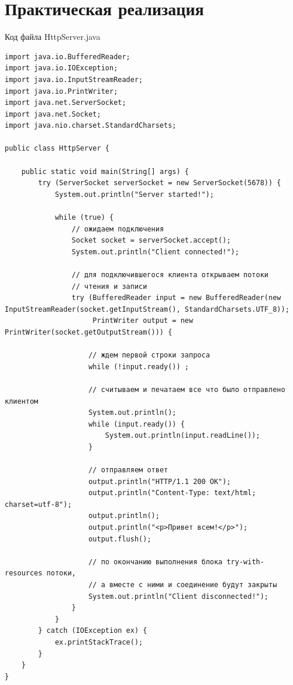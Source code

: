 \documentclass[a4paper, 14pt]{extarticle}
\begin{document}
\section{Практическая реализация}
Код файла HttpServer.java
\begin{lstlisting}
import java.io.BufferedReader;
import java.io.IOException;
import java.io.InputStreamReader;
import java.io.PrintWriter;
import java.net.ServerSocket;
import java.net.Socket;
import java.nio.charset.StandardCharsets;

public class HttpServer {

    public static void main(String[] args) {
        try (ServerSocket serverSocket = new ServerSocket(5678)) {
            System.out.println("Server started!");
            
            while (true) {
                // ожидаем подключения
                Socket socket = serverSocket.accept();
                System.out.println("Client connected!");

                // для подключившегося клиента открываем потоки 
                // чтения и записи
                try (BufferedReader input = new BufferedReader(new InputStreamReader(socket.getInputStream(), StandardCharsets.UTF_8));
                     PrintWriter output = new PrintWriter(socket.getOutputStream())) {

                    // ждем первой строки запроса
                    while (!input.ready()) ;

                    // считываем и печатаем все что было отправлено клиентом
                    System.out.println();
                    while (input.ready()) {
                        System.out.println(input.readLine());
                    }

                    // отправляем ответ
                    output.println("HTTP/1.1 200 OK");
                    output.println("Content-Type: text/html; charset=utf-8");
                    output.println();
                    output.println("<p>Привет всем!</p>");
                    output.flush();
                    
                    // по окончанию выполнения блока try-with-resources потоки, 
                    // а вместе с ними и соединение будут закрыты
                    System.out.println("Client disconnected!");
                }
            }
        } catch (IOException ex) {
            ex.printStackTrace();
        }
    }
}
\end{lstlisting}
\par
\end{document}

